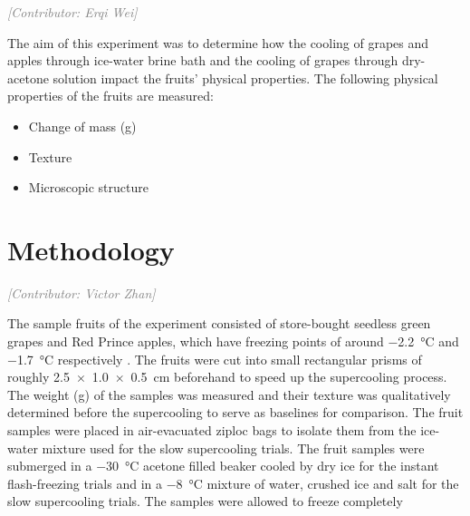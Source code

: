 \documentclass[12pt, a4paper]{article}
\newcommand{\contributor}[1]{\vspace{4pt}\noindent\textcolor{gray}{\small\textit{[Contributor: #1]}}\vspace{2pt}}
\begin{document}
\contributor{Erqi Wei}

The aim of this experiment was to determine how the cooling of grapes
and apples through ice-water brine bath and the cooling of grapes
through dry-acetone solution impact the fruits' physical properties. The
following physical properties of the fruits are measured:

\begin{itemize}
\item Change of mass (g)
\item Texture
\item Microscopic structure
\end{itemize}

\section{Methodology}


\contributor{Victor Zhan}

The sample fruits of the experiment consisted of store-bought seedless
green grapes and Red Prince apples, which have freezing points of around
$-$2.2~°C and $-$1.7~°C respectively \cite{zhao2025, wflo2018}. The
fruits were cut into small rectangular prisms of roughly 2.5~$\times$~1.0~$\times$~0.5~cm
beforehand to speed up the supercooling process. The weight (g) of the
samples was measured and their texture was qualitatively determined
before the supercooling to serve as baselines for comparison. The fruit
samples were placed in air-evacuated ziploc bags to isolate them from
the ice-water mixture used for the slow supercooling trials. The fruit
samples were submerged in a $-$30~°C acetone filled beaker cooled by dry
ice for the instant flash-freezing trials and in a $-$8~°C mixture of
water, crushed ice and salt for the slow supercooling trials. The
samples were allowed to freeze completely
\end{document}
